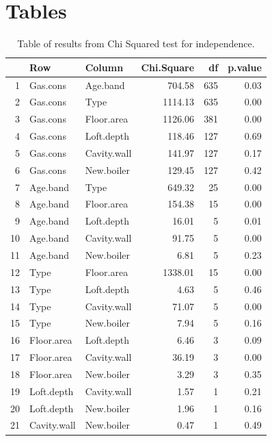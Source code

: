 \documentclass[9pt]{extarticle}
\begin{document}
\section{Tables}

\begin{table}[H]
	\centering
	\begin{tabular}{rllrrr}
		\hline
		& Row & Column & Chi.Square & df & p.value \\ 
		\hline
		1 & Gas.cons & Age.band & 704.58 & 635 & 0.03 \\ 
		2 & Gas.cons & Type & 1114.13 & 635 & 0.00 \\ 
		3 & Gas.cons & Floor.area & 1126.06 & 381 & 0.00 \\ 
		4 & Gas.cons & Loft.depth & 118.46 & 127 & 0.69 \\ 
		5 & Gas.cons & Cavity.wall & 141.97 & 127 & 0.17 \\ 
		6 & Gas.cons & New.boiler & 129.45 & 127 & 0.42 \\ 
		7 & Age.band & Type & 649.32 &  25 & 0.00 \\ 
		8 & Age.band & Floor.area & 154.38 &  15 & 0.00 \\ 
		9 & Age.band & Loft.depth & 16.01 &   5 & 0.01 \\ 
		10 & Age.band & Cavity.wall & 91.75 &   5 & 0.00 \\ 
		11 & Age.band & New.boiler & 6.81 &   5 & 0.23 \\ 
		12 & Type & Floor.area & 1338.01 &  15 & 0.00 \\ 
		13 & Type & Loft.depth & 4.63 &   5 & 0.46 \\ 
		14 & Type & Cavity.wall & 71.07 &   5 & 0.00 \\ 
		15 & Type & New.boiler & 7.94 &   5 & 0.16 \\ 
		16 & Floor.area & Loft.depth & 6.46 &   3 & 0.09 \\ 
		17 & Floor.area & Cavity.wall & 36.19 &   3 & 0.00 \\ 
		18 & Floor.area & New.boiler & 3.29 &   3 & 0.35 \\ 
		19 & Loft.depth & Cavity.wall & 1.57 &   1 & 0.21 \\ 
		20 & Loft.depth & New.boiler & 1.96 &   1 & 0.16 \\ 
		21 & Cavity.wall & New.boiler & 0.47 &   1 & 0.49 \\ 
		\hline
	\end{tabular}
\caption{Table of results from Chi Squared test for independence.}
\label{tab:chi}
\end{table}
\end{document}
